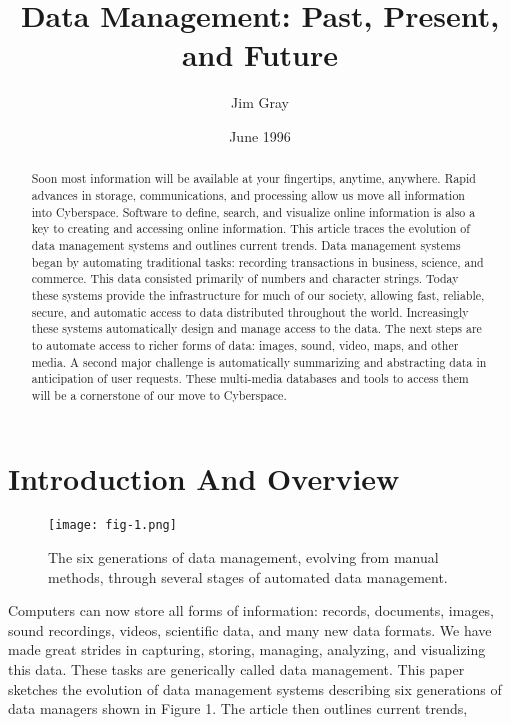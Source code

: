 \documentclass[a4paper,12pt,notitlepage,twoside,openright]{article}
\title{Data Management: Past, Present, and Future}
\author{Jim Gray}
\date{ June 1996}
\begin{document}
\maketitle

\begin{abstract}

Soon most information will be available at your
fingertips, anytime, anywhere. Rapid advances in storage,
communications, and processing allow us move all information into
Cyberspace. Software to define, search, and visualize online information
is also a key to creating and accessing online information. This article
traces the evolution of data management systems and outlines current
trends. Data management systems began by automating traditional tasks:
recording transactions in business, science, and commerce. This data
consisted primarily of numbers and character strings. Today these
systems provide the infrastructure for much of our society, allowing
fast, reliable, secure, and automatic access to data distributed
throughout the world. Increasingly these systems automatically design
and manage access to the data. The next steps are to automate access to
richer forms of data: images, sound, video, maps, and other media. A
second major challenge is automatically summarizing and abstracting data
in anticipation of user requests. These multi-media databases and tools
to access them will be a cornerstone of our move to Cyberspace.

\end{abstract}

\hypertarget{introduction-and-overview}{%
\section{Introduction And Overview}\label{introduction-and-overview}}

\begin{figure}
  \centering
  \texttt{[image: fig-1.png]}
  \caption{The six generations of data management, evolving from manual
methods, through several stages of automated data management.}
\end{figure}

Computers can now store all forms of information: records, documents,
images, sound recordings, videos, scientific data, and many new data
formats. We have made great strides in capturing, storing, managing,
analyzing, and visualizing this data. These tasks are generically called
data management. This paper sketches the evolution of data management
systems describing six generations of data managers shown in Figure 1.
The article then outlines current trends,
\end{document}
